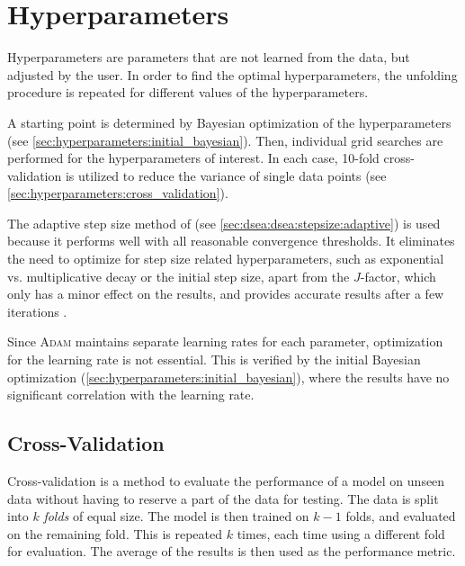 \clearpage %
\section{Hyperparameters}
Hyperparameters are parameters that are not learned from the data,
but adjusted by the user.
%
In order to find the optimal hyperparameters,
the unfolding procedure is repeated for different values of the hyperparameters.


A starting point is determined by Bayesian optimization of the hyperparameters
  (see \autoref{sec:hyperparameters:initial_bayesian}).
Then, individual grid searches are performed for the hyperparameters of interest.
%
In each case, 10-fold cross-validation is utilized to reduce the variance of single data points
  (see \autoref{sec:hyperparameters:cross_validation}).

The adaptive step size method of \dseaplus{}
  (see \autoref{sec:dsea:dsea:stepsize:adaptive})
is used
because it performs well with all reasonable convergence thresholds.
It eliminates the need to optimize for step size related hyperparameters,
  such as
    exponential vs. multiplicative decay
    or the initial step size,
  apart from the $J$-factor,
    which only has a minor effect on the results,
and provides accurate results after a few iterations \cite{dsea_mirko}.

Since \textsc{Adam} maintains separate learning rates for each parameter,
optimization for the learning rate is not essential.
This is verified by the initial Bayesian optimization (\autoref{sec:hyperparameters:initial_bayesian}),
  where the results have no significant correlation with the learning rate.


\subsection{Cross-Validation} \label{sec:hyperparameters:cross_validation}
Cross-validation \cite{cross_validation} is a method to evaluate the performance of a model on unseen data
without having to reserve a part of the data for testing.
%
The data is split into $k$ \emph{folds} of equal size. %
The model is then trained on $k-1$ folds,
and evaluated on the remaining fold.
This is repeated $k$ times,
each time using a different fold for evaluation.
The average of the results is then used as the performance metric.

